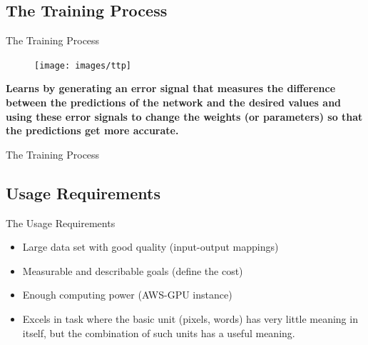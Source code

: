 \documentclass[10pt]{beamer}
\begin{document}
	\subsection{The Training Process}
	\begin{frame}{The Training Process}
		\begin{figure}
			\texttt{[image: images/ttp]}
		\end{figure}
		\textbf{Learns by generating an error signal that measures the difference between the predictions of the network and the desired values and using these error signals to change the weights (or parameters) so that the predictions get more accurate.}
	\end{frame}
	\begin{frame}{The Training Process}
	\end{frame}
	\subsection{Usage Requirements}
	\begin{frame}{The Usage Requirements}
		\large{\begin{itemize}
				\item<1> Large data set with good quality (input-output mappings)
				\item<2> Measurable and describable goals (define the cost)
				\item<3> Enough computing power (AWS-GPU instance)
				\item<4> Excels in task where the basic unit (pixels, words) has very little meaning in itself, but the \alert{combination of such units has a useful meaning}. 
			\end{itemize}
		}
	\end{frame}
\end{document}
